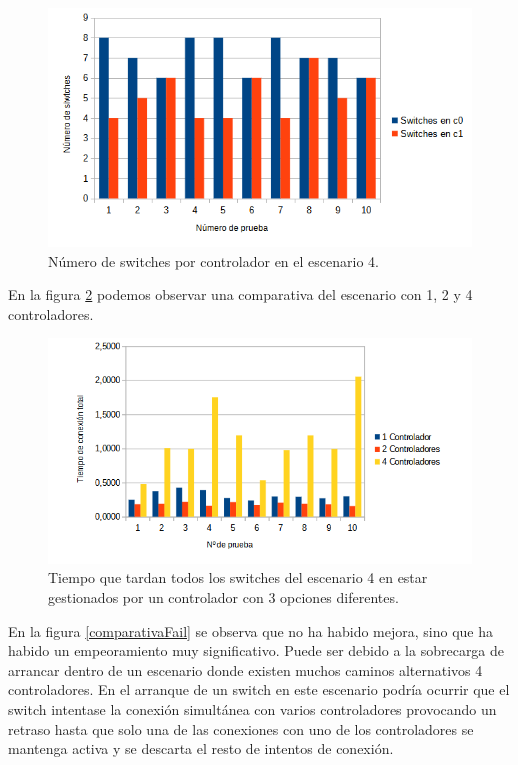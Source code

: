 \documentclass[a4paper, 12pt]{book}
\begin{document}
	\begin{figure}[H]
		\centering
		\includegraphics[width=16cm, keepaspectratio]{img/switchesporcontrollerescenario3}
		\caption{Número de switches por controlador en el escenario 4.}
		\label{figura:switchesporcontrollerescenario4}
	\end{figure}
	

	
En la figura \ref{figura:comparativaFail} podemos observar una comparativa del escenario con 1, 2 y 4 controladores.
	
	\begin{figure}[H]
		\centering
		\includegraphics[width=16cm, keepaspectratio]{img/comparativaFail}
		\caption{Tiempo que tardan todos los switches del escenario 4 en estar gestionados por un controlador con 3 opciones diferentes.}
		\label{figura:comparativaFail}
	\end{figure}
	
	En la figura \ref{comparativaFail} se observa que no ha habido mejora, sino que ha habido un empeoramiento muy  significativo. Puede ser debido a la sobrecarga de arrancar dentro de un escenario donde existen muchos caminos alternativos 4 controladores. En el arranque de un switch en este escenario podría ocurrir que el switch intentase la conexión simultánea con varios controladores provocando un retraso hasta que solo una de las conexiones con uno de los controladores se mantenga activa y se descarta el resto de intentos de conexión.
	
\end{document}
